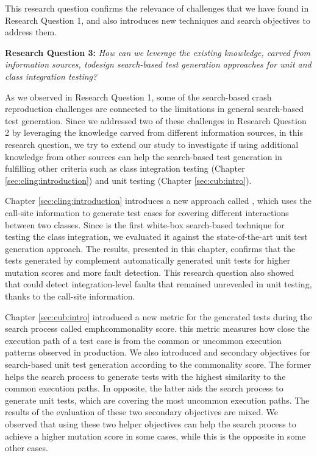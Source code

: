 This research question confirms the relevance of challenges that we have found in Research Question 1, and also introduces new techniques and search objectives to address them.

\textbf{Research Question 3: }\textit{How can we leverage the existing knowledge, carved from information sources, todesign search-based test generation approaches for unit and class integration testing?}

As we observed in Research Question 1, some of the search-based crash reproduction challenges are connected to the limitations in general search-based test generation. Since we addressed two of these challenges in Research Question 2 by leveraging the knowledge carved from different information sources, in this research question, we try to extend our study to investigate if using additional knowledge from other sources can help the search-based test generation in fulfilling other criteria such as class integration testing (Chapter \ref{sec:cling:introduction}) and unit testing (Chapter \ref{sec:cub:intro}).

Chapter \ref{sec:cling:introduction} introduces a new approach called \cling, which uses the call-site information to generate test cases for covering different interactions between two classes. Since \cling is the first white-box search-based technique for testing the class integration, we evaluated it against the state-of-the-art unit test generation approach. The results, presented in this chapter, confirms that the tests generated by \cling complement automatically generated unit tests for higher mutation scores and more fault detection. This research question also showed that \cling could detect integration-level faults that remained unrevealed in unit testing, thanks to the call-site information.


Chapter \ref{sec:cub:intro} introduced a new metric for the generated tests during the search process called emph{commonality score}. this metric measures how close the execution path of a test case is from the common or uncommon execution patterns observed in production. We also introduced \com and \ucom secondary objectives for search-based unit test generation according to the commonality score. The former helps the search process to generate tests with the highest similarity to the common execution paths. In opposite, the latter aids the search process to generate unit tests, which are covering the most uncommon execution paths. The results of the evaluation of these two secondary objectives are mixed. We observed that using these two helper objectives can help the search process to achieve a higher mutation score in some cases, while this is the opposite in some other cases.



